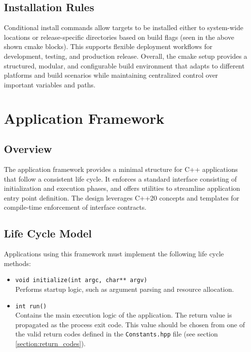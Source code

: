 \subsection{Installation Rules}

Conditional install commands allow targets to be installed either to system-wide locations or release-specific directories based on build flags (seen in the above shown cmake blocks). This supports flexible deployment workflows for development, testing, and production release. Overall, the cmake setup provides a structured, modular, and configurable build environment that adapts to different platforms and build scenarios while maintaining centralized control over important variables and paths.


















\section{Application Framework}
\label{section:app_framework}

\subsection*{Overview}
The application framework provides a minimal structure for C++ applications that follow a consistent life cycle. It enforces a standard interface consisting of initialization and execution phases, and offers utilities to streamline application entry point definition. The design leverages C++20 concepts and templates for compile-time enforcement of interface contracts.

\subsection*{Life Cycle Model}
Applications using this framework must implement the following life cycle methods:
\begin{itemize}\itemsep0em
	\item \texttt{void initialize(int argc, char** argv)} \\
	Performs startup logic, such as argument parsing and resource allocation.
	\item \texttt{int run()} \\
	Contains the main execution logic of the application. The return value is propagated as the process exit code. This value should be chosen from one of the valid return codes defined in the \texttt{Constants.hpp} file (see section \ref{section:return_codes}).
\end{itemize}

